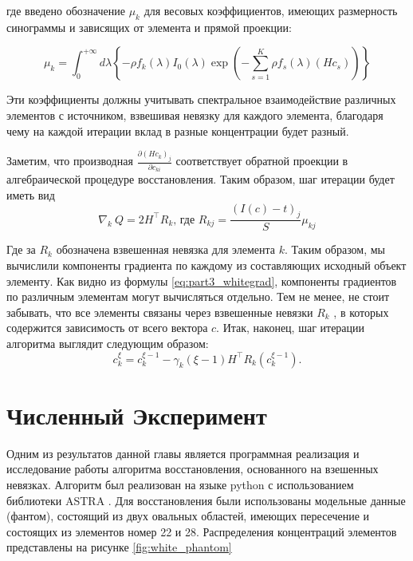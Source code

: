 где введено обозначение $\mu_k$ для весовых коэффициентов, имеющих размерность синограммы и зависящих от элемента и прямой проекции:

\begin{equation}
  \label{eq:weights}
  \mu_{k} = \int_0^{+\infty} {d\lambda \left\{
    -\rho f_k(\lambda) 
    I_0(\lambda)
    \exp{\left(
      -\sum_{s=1}^K {\rho f_s(\lambda) (H c_s)} 
         \right)}
    \right\}}
\end{equation}

Эти коэффициенты должны учитывать спектральное взаимодействие различных элементов с источником, взвешивая невязку для каждого элемента, благодаря чему на каждой итерации вклад в разные концентрации будет разный.

Заметим, что производная $\frac {\partial (H c_k)_j} {\partial c_{ki}}$ соответствует обратной проекции в алгебраической процедуре восстановления. 
Таким образом, шаг итерации будет иметь вид
\begin{equation} \label{eq:part3_whitegrad}
  \nabla_k \ Q = 2H^\intercal R_k \text{, где } R_{kj} = \frac {(I(c) - t)_j} {S} \mu_{kj}
\end{equation}

Где за $R_k$ обозначена взвешенная невязка для элемента $k$. 
Таким образом, мы вычислили компоненты градиента по каждому из составляющих исходный объект элементу.
Как видно из формулы \ref{eq:part3_whitegrad}, компоненты градиентов по различным элементам могут вычисляться отдельно.
Тем не менее, не стоит забывать, что все элементы связаны через взвешенные невязки $R_k$ , в которых содержится зависимость от всего вектора $c$.
Итак, наконец, шаг итерации алгоритма выглядит следующим образом:
\begin{equation}
  \label{white_iteration}
  c_k^\xi = c_k^{\xi - 1} - \gamma_k (\xi - 1) H^\intercal R_k(c_k^{\xi - 1}).
\end{equation}

\section{Численный Эксперимент} \label{sect_3_2}
Одним из результатов данной главы является программная реализация и исследование работы алгоритма восстановления, основанного на взешенных невязках.
Алгоритм был реализован на языке python с использованием библиотеки ASTRA \cite{van2015astra}.
Для восстановления были использованы модельные данные (фантом), состоящий из двух овальных областей, имеющих пересечение и состоящих из элементов номер 22 и 28.
Распределения концентраций элементов представлены на рисунке \ref{fig:white_phantom}

